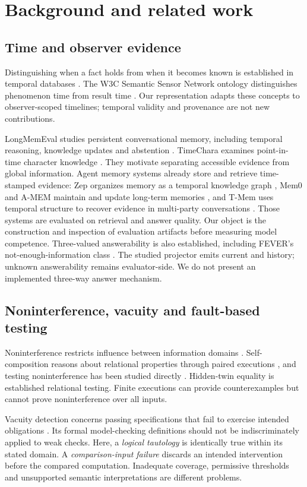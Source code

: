 \documentclass[11pt]{article}
\begin{document}
\section{Background and related work}
\subsection{Time and observer evidence}
Distinguishing when a fact holds from when it becomes known is established in temporal databases \cite{snodgrass}. The W3C Semantic Sensor Network ontology distinguishes phenomenon time from result time \cite{ssn}. Our representation adapts these concepts to observer-scoped timelines; temporal validity and provenance are not new contributions.

LongMemEval studies persistent conversational memory, including temporal reasoning, knowledge updates and abstention \cite{longmemeval}. TimeChara examines point-in-time character knowledge \cite{timechara}. They motivate separating accessible evidence from global information. Agent memory systems already store and retrieve time-stamped evidence: Zep organizes memory as a temporal knowledge graph \cite{zep}, Mem0 and A-MEM maintain and update long-term memories \cite{mem0,amem}, and T-Mem uses temporal structure to recover evidence in multi-party conversations \cite{tmem}. Those systems are evaluated on retrieval and answer quality. Our object is the construction and inspection of evaluation artifacts before measuring model competence. Three-valued answerability is also established, including FEVER's not-enough-information class \cite{fever}. The studied projector emits current and history; unknown answerability remains evaluator-side. We do not present an implemented three-way answer mechanism.

\subsection{Noninterference, vacuity and fault-based testing}
Noninterference restricts influence between information domains \cite{goguen}. Self-composition reasons about relational properties through paired executions \cite{barthe}, and testing noninterference has been studied directly \cite{hritcu}. Hidden-twin equality is established relational testing. Finite executions can provide counterexamples but cannot prove noninterference over all inputs.

Vacuity detection concerns passing specifications that fail to exercise intended obligations \cite{beer,kupferman}. Its formal model-checking definitions should not be indiscriminately applied to weak checks. Here, a \emph{logical tautology} is identically true within its stated domain. A \emph{comparison-input failure} discards an intended intervention before the compared computation. Inadequate coverage, permissive thresholds and unsupported semantic interpretations are different problems.
\end{document}
